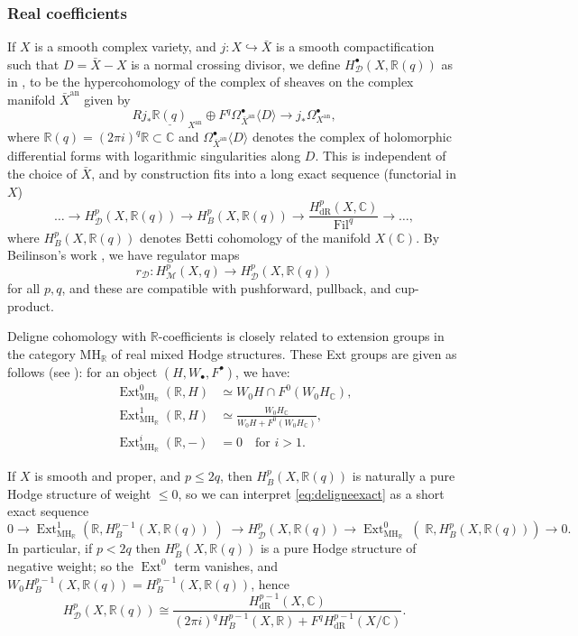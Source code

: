 \documentclass[11pt, a4paper, reqno]{amsart}
\theoremstyle{definition}
\theoremstyle{plain}
\theoremstyle{remark}
\DeclareMathOperator{\Ext}{Ext}
\DeclareMathOperator{\Fil}{Fil}
\DeclareMathOperator{\dR}{dR}
\DeclareMathOperator{\mot}{\mathscr{M}}
\newcommand{\numberset}{\mathbb}
\newcommand{\C}{\numberset{C}}
\newcommand{\R}{\numberset{R}}
\newcommand{\MH}{\mathrm{MH}}
\newcommand{\del}{\mathcal{D}}
\renewcommand{\le}{\leqslant}
\begin{document}
  \subsubsection*{Real coefficients} 
  
  If $X$ is a smooth complex variety, and $j : X \hookrightarrow \bar{X}$ is a smooth compactification such that $D = \bar{X} - X$ is a normal crossing divisor, we define $H_{\del}^\bullet(X, \R(q))$ as in \cite[Definition 2.9]{esnaultviehweg}, to be the hypercohomology of the complex of sheaves on the complex manifold $\bar{X}^{\mathrm{an}}$ given by
  \[ Rj_* \underline{\R(q)}_{X^{\mathrm{an}}} \oplus F^q \Omega^\bullet_{\bar{X}^{\mathrm{an}}}\langle D\rangle \to j_* \Omega^\bullet_{X^{\mathrm{an}}}, \]
  where $\R(q) = (2\pi i)^q \R \subset \C$ and $\Omega^\bullet_{\bar{X}^{\mathrm{an}}}\langle D\rangle$ denotes the complex of holomorphic differential forms with logarithmic singularities along $D$. This is independent of the choice of $\bar{X}$, and by construction fits into a long exact sequence (functorial in $X$)
  \begin{equation}
   \label{eq:deligneexact}
   \dots \to H^p_{\del}(X, \R(q)) \to H^p_B(X, \R(q)) \to \frac{H^p_{\dR}(X, \C)}{\Fil^q} \to \dots,
  \end{equation}
  where $H^p_B(X, \R(q))$ denotes Betti cohomology of the manifold $X(\C)$. By Beilinson's work \cite{beilinson84}, we have regulator maps
  \[ r_{\del} : H^p_{\mot}(X, q) \to H^p_{\del}(X, \R(q))\]
  for all $p, q$, and these are compatible with pushforward, pullback, and cup-product.
  
  Deligne cohomology with $\R$-coefficients is closely related to extension groups in the category $\MH_\R$ of real mixed Hodge structures. These Ext groups are given as follows (see \cite[Equation 2.4.2]{jannsen88b}): for an object $(H, W_\bullet, F^\bullet)$, we have:
  \begin{equation}
   \label{eq:ext-groups}
   \begin{aligned}
    \Ext^0_{\MH_\R}(\R, H) &\simeq W_0 H \cap F^0 (W_0 H_{\C}), \\
    \Ext^1_{\MH_\R}(\R, H) &\simeq \frac{W_0 H_{\C}}{W_0 H + F^0(W_0 H_{\C})}, \\
    \Ext^i_{\MH_\R}(\R, -) &= 0 \quad \text{for $i>1$}.
   \end{aligned}
  \end{equation}
  
  If $X$ is smooth and proper, and $p \le 2q$, then $H^p_B(X, \R(q))$ is naturally a pure Hodge structure of weight $\le 0$, so we can interpret \eqref{eq:deligneexact} as a short exact sequence
  \[
   0 \to \Ext^1_{\MH_\R}\left(\R, H^{p-1}_B(X, \R(q))\middle) \to H_{\del}^{p}(X, \R(q)) \to \Ext^0_{\MH_\R}\middle(\R, H^{p}_B(X, \R(q))\right) \to 0.
  \]
  In particular, if $p < 2q$ then $H^{p}_B(X, \R(q))$ is a pure Hodge structure of negative weight; so the $\Ext^0$ term vanishes, and $W_0 H^{p-1}_B(X, \R(q)) = H^{p-1}_B(X, \R(q))$, hence
  \[ H_{\del}^{p}(X, \R(q)) \cong \frac{H^{p-1}_{\dR}(X, \C)}{(2\pi i)^q H^{p-1}_B(X, \R) + F^q H^{p-1}_{\dR}(X/\C)}.\]
\end{document}
